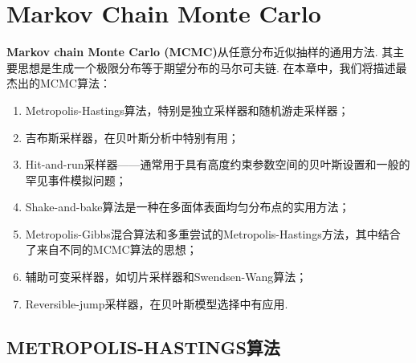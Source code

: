 \documentclass[a4paper,UTF-8,12pt]{ctexbook}
\numberwithin{equation}{chapter}
\begin{document}
		\chapter{Markov Chain Monte Carlo}
		\textbf{Markov chain Monte Carlo (MCMC)}从任意分布近似抽样的通用方法. 其主要思想是生成一个极限分布等于期望分布的马尔可夫链. 在本章中，我们将描述最杰出的MCMC算法：
		\begin{enumerate}
			\item Metropolis-Hastings算法，特别是独立采样器和随机游走采样器；
			\item  吉布斯采样器，在贝叶斯分析中特别有用；
			\item Hit-and-run采样器——通常用于具有高度约束参数空间的贝叶斯设置和一般的罕见事件模拟问题；
			\item  Shake-and-bake算法是一种在多面体表面均匀分布点的实用方法；
			\item Metropolis-Gibbs混合算法和多重尝试的Metropolis-Hastings方法，其中结合了来自不同的MCMC算法的思想；
			\item 辅助可变采样器，如切片采样器和Swendsen-Wang算法；
			\item Reversible-jump采样器，在贝叶斯模型选择中有应用.
		\end{enumerate}
		
		\section{METROPOLIS-HASTINGS算法}
	
	
		
	
	
	
		
	
\end{document}
